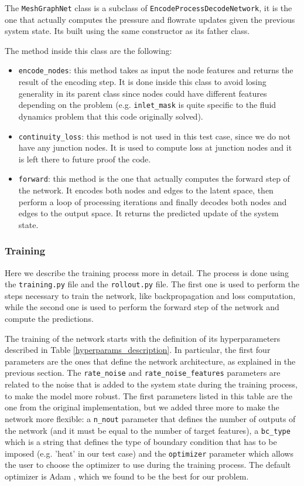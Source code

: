 \documentclass[11pt,a4paper]{article}
\begin{document}
The \texttt{MeshGraphNet} class is a subclass of \texttt{EncodeProcessDecodeNetwork}, it is the one that actually computes the pressure and flowrate updates given the previous system state. Its built using the same constructor as its father class. 

The method inside this class are the following:
\begin{itemize}
    \item \texttt{encode\_nodes}: this method takes as input the node features and returns the result of the encoding step. It is done inside this class to avoid losing generality in its parent class since nodes could have different features depending on the problem (e.g. \texttt{inlet\_mask} is quite specific to the fluid dynamics problem that this code originally solved).
    \item \texttt{continuity\_loss}: this method is not used in this test case, since we do not have any junction nodes. It is used to compute loss at junction nodes and it is left there to future proof the code.
    \item \texttt{forward}: this method is the one that actually computes the forward step of the network. It encodes both nodes and edges to the latent space, then perform a loop of processing iterations and finally decodes both nodes and edges to the output space. It returns the predicted update of the system state.
\end{itemize}

\subsubsection*{Training}

Here we describe the training process more in detail. The process is done using the \texttt{training.py} file and the \texttt{rollout.py} file. The first one is used to perform the steps necessary to train the network, like backpropagation and loss computation, while the second one is used to perform the forward step of the network and compute the predictions.

The training of the network starts with the definition of its hyperparameters described in Table \ref{hyperparams_description}. In particular, the first four parameters are the ones that define the network architecture, as explained in the previous section. The \texttt{rate\_noise} and \texttt{rate\_noise\_features} parameters are related to the noise that is added to the system state during the training process, to make the model more robust. The first parameters listed in this table are the one from the original implementation, but we added three more to make the network more flexible: a \texttt{n\_nout} parameter that defines the number of outputs of the network (and it must be equal to the number of target features), a \texttt{bc\_type} which is a string that defines the type of boundary condition that has to be imposed (e.g. 'heat' in our test case) and the \texttt{optimizer} parameter which allows the user to choose the optimizer to use during the training process. The default optimizer is Adam \cite{Kingma_Ba_2017}, which we found to be the best for our problem.
\end{document}
